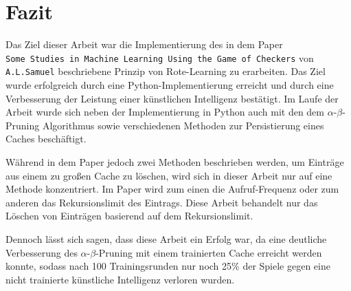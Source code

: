 \documentclass[11pt]{article}
\begin{document}
    \hypertarget{fazit}{%
\section{Fazit}\label{fazit}}

Das Ziel dieser Arbeit war die Implementierung des in dem Paper
\texttt{Some\ Studies\ in\ Machine\ Learning\ Using\ the\ Game\ of\ Checkers}
von \texttt{A.L.Samuel} beschriebene Prinzip von Rote-Learning zu
erarbeiten. Das Ziel wurde erfolgreich durch eine Python-Implementierung
erreicht und durch eine Verbesserung der Leistung einer künstlichen
Intelligenz bestätigt. Im Laufe der Arbeit wurde sich neben der
Implementierung in Python auch mit den dem $\alpha$-$\beta$-Pruning Algorithmus sowie
verschiedenen Methoden zur Persistierung eines Caches beschäftigt.

Während in dem Paper jedoch zwei Methoden beschrieben werden, um
Einträge aus einem zu großen Cache zu löschen, wird sich in dieser
Arbeit nur auf eine Methode konzentriert. Im Paper wird zum einen die
Aufruf-Frequenz oder zum anderen das Rekursionslimit des Eintrags. Diese
Arbeit behandelt nur das Löschen von Einträgen basierend auf dem
Rekursionslimit.

Dennoch lässt sich sagen, dass diese Arbeit ein Erfolg war, da eine
deutliche Verbesserung des $\alpha$-$\beta$-Pruning mit einem trainierten Cache
erreicht werden konnte, sodass nach 100 Trainingsrunden nur noch 25\%
der Spiele gegen eine nicht trainierte künstliche Intelligenz verloren
wurden.


    
    
    
\end{document}
